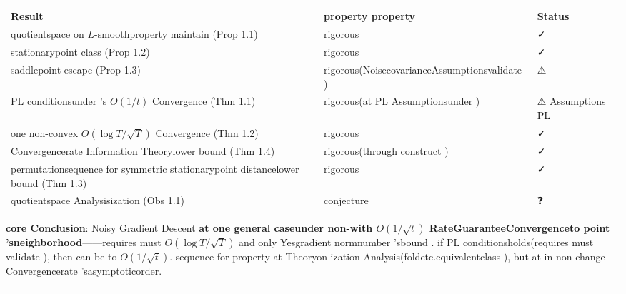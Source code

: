 \documentclass[
  12pt,
]{article}
\begin{document}
\begin{longtable}[]{@{}
  >{\raggedright\arraybackslash}p{}
  >{\raggedright\arraybackslash}p{}
  >{\raggedright\arraybackslash}p{}@{}}
\toprule\noalign{}
\begin{minipage}[b]{\linewidth}\raggedright
Result
\end{minipage} & \begin{minipage}[b]{\linewidth}\raggedright
property property
\end{minipage} & \begin{minipage}[b]{\linewidth}\raggedright
Status
\end{minipage} \\
\midrule\noalign{}
\endhead
\bottomrule\noalign{}
\endlastfoot
quotientspace on  \(L\)-smoothproperty maintain  (Prop 1.1) & rigorous & ✓ \\
stationarypoint class  (Prop 1.2) & rigorous & ✓ \\
saddlepoint escape (Prop 1.3) & rigorous(NoisecovarianceAssumptionsvalidate ) & ⚠ \\
PL conditionsunder 's \(O(1/t)\) Convergence (Thm 1.1) & rigorous(at  PL Assumptionsunder ) & ⚠ Assumptions
PL \\
one non-convex \(O(\log T/\sqrt{T})\) Convergence (Thm 1.2) & rigorous & ✓ \\
Convergencerate Information Theorylower bound (Thm 1.4) & rigorous(through construct ) & ✓ \\
permutationsequence for symmetric stationarypoint distancelower bound (Thm 1.3) & rigorous & ✓ \\
quotientspace Analysisization  (Obs 1.1) & conjecture & ❓ \\
\end{longtable}

\textbf{core Conclusion}: Noisy Gradient Descent \textbf{at one general caseunder non-with 
\(O(1/\sqrt{t})\) RateGuaranteeConvergenceto point 'sneighborhood}------requires must 
\(O(\log T/\sqrt{T})\) and only Yesgradient normnumber 'sbound . if  PL
conditionsholds(requires must validate ), then can be to 
\(O(1/\sqrt{t})\). sequence for property at Theoryon ization Analysis(foldetc.equivalentclass ), but at in non-change Convergencerate 'sasymptoticorder. 

\begin{center}\rule{0.5\linewidth}{0.5pt}\end{center}
\end{document}
